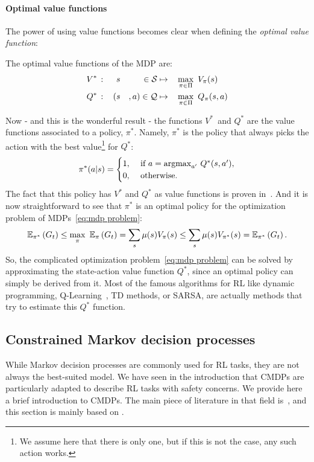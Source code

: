 			\paragraph{Optimal value functions} The power of using value functions becomes clear when defining the\emph{ optimal value function}:
			\begin{definition}
				The optimal value functions of the MDP are:
				\begin{alignat}{6}
					V^*\,&:&\,&s&\in\mathcal{S}&\mapsto& & \max_{\pi\in\Pi}~V_\pi(s) \label{eq:optimal state value}\\
					Q^*\,&:&\,(&s&, a)\in\mathcal{Q}&\mapsto& & \max_{\pi\in\Pi}~Q_\pi(s, a) \label{eq:optimal state action value}
				\end{alignat}
			\end{definition}
			Now - and this is the wonderful result - the functions $V^*$~and $Q^*$ are the value functions associated to a policy, $\pi^*$. Namely, $\pi^*$ is the policy that always picks the action with the best value\footnote{We assume here that there is only one, but if this is not the case, any such action works.} for $Q^*$:
			\begin{equation}
				\pi^*(a|s) = \begin{cases}
				1,&\text{ if } a = \operatorname*{argmax}_{a'}\,Q^*(s, a'),\\
				0,&\text{ otherwise}.
				\end{cases} \label{eq:optimal policy}
			\end{equation} The fact that this policy has $V^*$ and $Q^*$ as value functions is proven in~\cite[Chapter\,4]{sutton2018reinforcement}. And it is now straightforward to see that $\pi^*$ is an optimal policy for the optimization problem of MDPs~\eqref{eq:mdp problem}:
			\begin{equation*}
				\mathbb{E}_{\pi^*}\left(G_t\right) \leq \max_\pi~\mathbb{E}_\pi\left(G_t\right) = \sum_s \mu(s) V_\pi(s) \leq \sum_s \mu(s) V_{\pi^*}(s) = \mathbb{E}_{\pi^*}\left(G_t\right).
			\end{equation*}
			So, the complicated optimization problem~\eqref{eq:mdp problem} can be solved by approximating the state-action value function $Q^*$, since an optimal policy can simply be derived from it. Most of the famous algorithms for RL like dynamic programming\needcite, Q-Learning~\cite{watkins1992q}, TD methods\needcite, or SARSA\needcite, are actually methods that try to estimate this $Q^*$ function.
		\subsection{Constrained Markov decision processes}
		While Markov decision processes are commonly used for RL tasks, they are not always the best-suited model. We have seen in the introduction that CMDPs are particularly adapted to describe RL tasks with safety concerns. We provide here a brief introduction to CMDPs. The main piece of literature in that field is~\cite{altman1999constrained}, and this section is mainly based on \cite[Chapter\,3]{altman1999constrained}.
